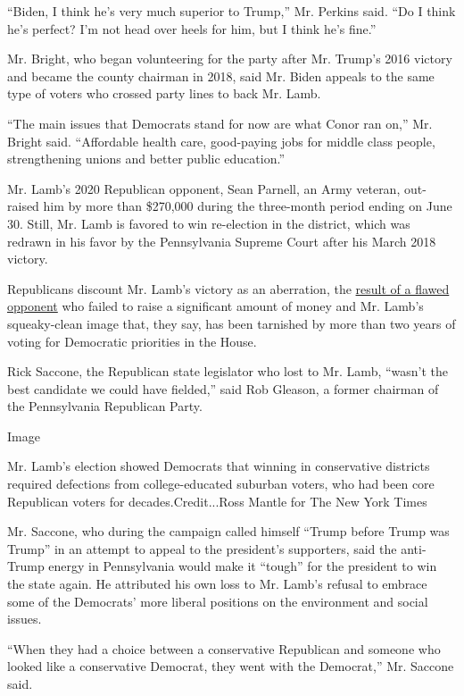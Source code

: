 ``Biden, I think he's very much superior to Trump,'' Mr. Perkins said.
``Do I think he's perfect? I'm not head over heels for him, but I think
he's fine.''

Mr. Bright, who began volunteering for the party after Mr. Trump's 2016
victory and became the county chairman in 2018, said Mr. Biden appeals
to the same type of voters who crossed party lines to back Mr. Lamb.

``The main issues that Democrats stand for now are what Conor ran on,''
Mr. Bright said. ``Affordable health care, good-paying jobs for middle
class people, strengthening unions and better public education.''

Mr. Lamb's 2020 Republican opponent, Sean Parnell, an Army veteran,
out-raised him by more than \$270,000 during the three-month period
ending on June 30. Still, Mr. Lamb is favored to win re-election in the
district, which was redrawn in his favor by the Pennsylvania Supreme
Court after his March 2018 victory.

Republicans discount Mr. Lamb's victory as an aberration, the
\href{https://www.nytimes3xbfgragh.onion/2018/01/17/us/politics/trump-pennsylvania-house-special-election.html}{result
of a flawed opponent} who failed to raise a significant amount of money
and Mr. Lamb's squeaky-clean image that, they say, has been tarnished by
more than two years of voting for Democratic priorities in the House.

Rick Saccone, the Republican state legislator who lost to Mr. Lamb,
``wasn't the best candidate we could have fielded,'' said Rob Gleason, a
former chairman of the Pennsylvania Republican Party.

Image

Mr. Lamb's election showed Democrats that winning in conservative
districts required defections from college-educated suburban voters, who
had been core Republican voters for decades.Credit...Ross Mantle for The
New York Times

Mr. Saccone, who during the campaign called himself ``Trump before Trump
was Trump'' in an attempt to appeal to the president's supporters, said
the anti-Trump energy in Pennsylvania would make it ``tough'' for the
president to win the state again. He attributed his own loss to Mr.
Lamb's refusal to embrace some of the Democrats' more liberal positions
on the environment and social issues.

``When they had a choice between a conservative Republican and someone
who looked like a conservative Democrat, they went with the Democrat,''
Mr. Saccone said.

